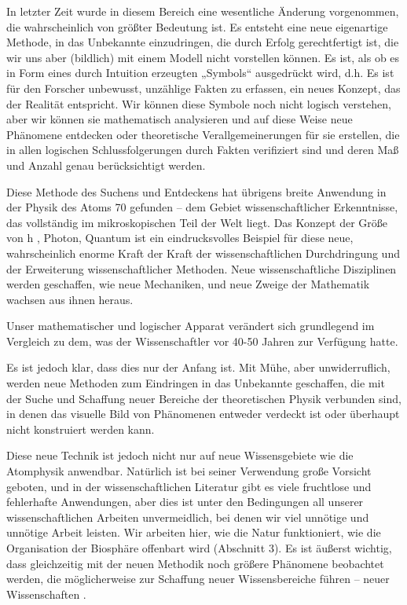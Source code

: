 \documentclass[11pt,a4paper]{book}
\begin{document}
In letzter Zeit wurde in diesem Bereich eine wesentliche Änderung vorgenommen, die wahrscheinlich von größter Bedeutung ist. Es entsteht eine neue eigenartige Methode, in das Unbekannte einzudringen, die durch Erfolg gerechtfertigt ist, die wir uns aber (bildlich) mit einem Modell nicht vorstellen können. Es ist, als ob es in Form eines durch Intuition erzeugten „Symbols“ ausgedrückt wird, d.h. Es ist für den Forscher unbewusst, unzählige Fakten zu erfassen, ein neues Konzept, das der Realität entspricht. Wir können diese Symbole noch nicht logisch verstehen, aber wir können sie mathematisch analysieren und auf diese Weise neue Phänomene entdecken oder theoretische Verallgemeinerungen für sie erstellen, die in allen logischen Schlussfolgerungen durch Fakten verifiziert sind und deren Maß und Anzahl genau berücksichtigt werden.



Diese Methode des Suchens und Entdeckens hat übrigens breite Anwendung in der Physik des Atoms 70 gefunden -- dem Gebiet wissenschaftlicher Erkenntnisse, das vollständig im mikroskopischen Teil der Welt liegt. Das Konzept der Größe von h , Photon, Quantum ist ein eindrucksvolles Beispiel für diese neue, wahrscheinlich enorme Kraft der Kraft der wissenschaftlichen Durchdringung und der Erweiterung wissenschaftlicher Methoden. Neue wissenschaftliche Disziplinen werden geschaffen, wie neue Mechaniken, und neue Zweige der Mathematik wachsen aus ihnen heraus.



Unser mathematischer und logischer Apparat verändert sich grundlegend im Vergleich zu dem, was der Wissenschaftler vor 40-50 Jahren zur Verfügung hatte.



Es ist jedoch klar, dass dies nur der Anfang ist. Mit Mühe, aber unwiderruflich, werden neue Methoden zum Eindringen in das Unbekannte geschaffen, die mit der Suche und Schaffung neuer Bereiche der theoretischen Physik verbunden sind, in denen das visuelle Bild von Phänomenen entweder verdeckt ist oder überhaupt nicht konstruiert werden kann.



Diese neue Technik ist jedoch nicht nur auf neue Wissensgebiete wie die Atomphysik anwendbar. Natürlich ist bei seiner Verwendung große Vorsicht geboten, und in der wissenschaftlichen Literatur gibt es viele fruchtlose und fehlerhafte Anwendungen, aber dies ist unter den Bedingungen all unserer wissenschaftlichen Arbeiten unvermeidlich, bei denen wir viel unnötige und unnötige Arbeit leisten. Wir arbeiten hier, wie die Natur funktioniert, wie die Organisation der Biosphäre offenbart wird (Abschnitt 3). Es ist äußerst wichtig, dass gleichzeitig mit der neuen Methodik noch größere Phänomene beobachtet werden, die möglicherweise zur Schaffung neuer Wissensbereiche führen -- neuer Wissenschaften .
\end{document}
